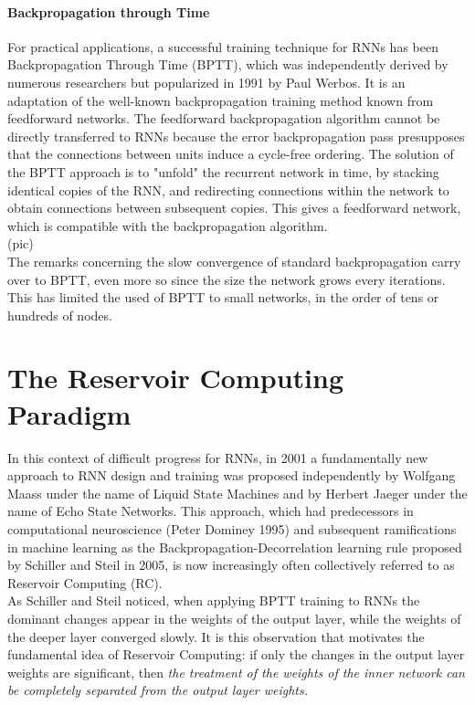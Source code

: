 \documentclass[12pt,oneside]{CUNY_CS_PhD}
\begin{document}
\subsubsection{Backpropagation through Time}
For practical applications, a successful training technique for RNNs has been Backpropagation Through Time (BPTT), which was independently derived by numerous researchers but popularized in 1991 by Paul Werbos. It is an adaptation of the well-known backpropagation training method known from feedforward networks. The feedforward backpropagation algorithm cannot be directly transferred to RNNs because the error backpropagation pass presupposes that the connections between units induce a cycle-free ordering. The solution of the BPTT approach is to "unfold" the recurrent network in time, by stacking identical copies of the RNN, and redirecting connections within the network to obtain connections between subsequent copies. This gives a feedforward network, which is compatible with the backpropagation algorithm.\\
(pic)\\
The remarks concerning the slow convergence of standard backpropagation carry over to BPTT, even more so since the size the network grows every iterations. This has limited the used of BPTT to small networks, in the order of tens or hundreds of nodes.

\chapter{The Reservoir Computing Paradigm}
In this context of difficult progress for RNNs, in 2001 a fundamentally new approach to RNN design and training was proposed independently by Wolfgang Maass under the name of Liquid State Machines and by Herbert Jaeger under the name of Echo State Networks. This approach, which had predecessors in computational neuroscience (Peter Dominey 1995) and subsequent ramifications in machine learning as the Backpropagation-Decorrelation learning rule proposed by Schiller and Steil in 2005, is now increasingly often collectively referred to as Reservoir Computing (RC).\\
As Schiller and Steil noticed, when applying BPTT training to RNNs the dominant changes appear in the weights of the output layer, while the weights of the deeper layer converged slowly. It is this observation that  motivates the fundamental idea of Reservoir Computing: if only the changes in the output layer weights are significant, then {\itshape the treatment of the weights of the inner network can be completely separated from the output layer weights.}
\end{document}
